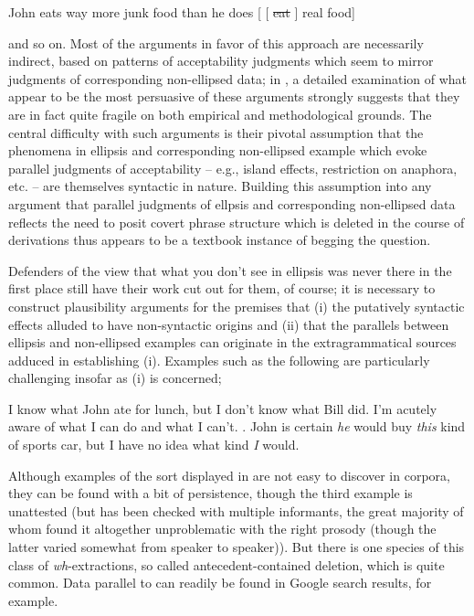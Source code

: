 \documentclass[output=paper,colorlinks,citecolor=brown]{langscibook}
\begin{document}
\begin{exe}
 \ex\label{pseudodeletion}
  John eats way more junk food than he does [ [ \sout{eat} {\gp}\xspace ] real food]
\end{exe}
and so on. Most of the arguments in favor of this approach are
necessarily indirect, based on patterns of acceptability judgments which seem to
mirror judgments of corresponding non\hyp ellipsed data; in \citet{kubotalevineBook}, a
detailed examination of what appear to be the most persuasive of these
arguments strongly suggests that they are in fact quite fragile on
both empirical and methodological grounds. The central difficulty with
such arguments is their pivotal assumption  that
the phenomena in  ellipsis and corresponding non-ellipsed example
which evoke parallel judgments of acceptability -- e.g., island effects,
restriction on anaphora, etc. -- are themselves syntactic in
nature. Building this assumption into any argument that parallel
judgments of ellpsis and corresponding non-ellipsed data reflects the
need to posit covert phrase structure which is deleted in the course
of derivations thus appears to be a textbook instance of begging the question.

Defenders of the view that what you don't see in ellipsis was never
there in the first place still have their work cut out for them, of
course; it is necessary to construct plausibility arguments for the
premises that (i) the putatively syntactic effects alluded to have
non-syntactic origins and (ii) that the parallels between ellipsis and
non-ellipsed examples can originate in the extragrammatical sources
adduced in establishing (i). Examples such as the following are
particularly challenging insofar as (i) is concerned;


\begin{exe}
 \ex\label{extrac-from-VPE}
  \begin{xlist}
 \ex\label{extrac-from-VPE_a}
    I know what John ate for lunch,  but I don't know what Bill did.
 \ex\label{extrac-from-VPE_b}
    I'm acutely aware of what I can do and what I
  can't. \citep[735]{mahoney2004}.
 \ex\label{extrac-from-VPE_c}
    John is certain \textsl{he} would buy \textsl{this} kind of sports car, but I have no idea what kind \textsl{I} would.
  \end{xlist}
\end{exe}
Although examples of the sort displayed in  are not
easy to discover in corpora, they can be found with a bit of
persistence, though the third example is unattested (but has been
checked with multiple informants, the great majority of whom found it
altogether unproblematic with the right prosody (though the latter
varied somewhat from speaker to speaker)). But there is one species of this class of
\textit{wh}-extractions, so called antecedent-contained deletion,  which is
quite common. Data parallel to  can readily be found in
Google search results, for example.
\end{document}
